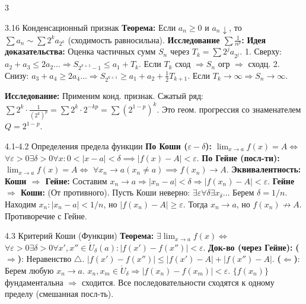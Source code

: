\documentclass[8pt, a4paper, landscape]{extarticle}
\newcommand{\Ra}{\Rightarrow}
\newcommand{\eps}{\varepsilon}
\begin{document}
\begin{multicols*}{3}
\begin{ticket}{3.16 Конденсационный признак}
\textbf{Теорема:} Если $a_n \ge 0$ и $a_n \downarrow$, то
$\sum a_n \sim \sum 2^k a_{2^k}$ (сходимость равносильна).
\textbf{Исследование $\sum \frac{1}{n^p}$:}
\tcblower
\textbf{Идея доказательства:}
Оценка частичных сумм $S_n$ через $T_k = \sum 2^j a_{2^j}$.
1. Сверху: $a_2+a_3 \le 2a_2 \dots \Ra S_{2^{k+1}-1} \le a_1 + T_k$.
Если $T_k$ сход $\Ra S_n$ огр $\Ra$ сходц.
2. Снизу: $a_3+a_4 \ge 2a_4 \dots \Ra S_{2^{k+1}} \ge a_1 + a_2 + \frac{1}{2}T_{k+1}$.
Если $T_k \to \infty \Ra S_n \to \infty$.

\textbf{Исследование:}
Применим конд. признак. Сжатый ряд:
$\sum 2^k \cdot \frac{1}{(2^k)^p} = \sum 2^k \cdot 2^{-kp} = \sum (2^{1-p})^k$.
Это геом. прогрессия со знаменателем $Q = 2^{1-p}$.
\end{ticket}



\begin{ticket}{4.1-4.2 Определения предела функции}
\textbf{По Коши ($\varepsilon-\delta$):} $\lim_{x\to a} f(x)=A \iff$
$\forall \eps>0 \exists \delta>0 \forall x: 0 < |x-a| < \delta \implies |f(x)-A| < \eps$.
\textbf{По Гейне (посл-ти):} $\lim_{x\to a} f(x)=A \iff$
$\forall x_n \to a (x_n \ne a) \implies f(x_n) \to A$.
\tcblower
\textbf{Эквивалентность:}
\textbf{Коши $\Ra$ Гейне:} Составим $x_n \to a \Ra |x_n-a| < \delta \Ra |f(x_n)-A| < \eps$.
\textbf{Гейне $\Ra$ Коши:} (От противного).
Пусть Коши неверно: $\exists \eps \forall \delta \exists x_\delta \dots$
Берем $\delta = 1/n$. Находим $x_n: |x_n-a| < 1/n$, но $|f(x_n)-A| \ge \eps$.
Тогда $x_n \to a$, но $f(x_n) \not\to A$. Противоречие с Гейне.
\end{ticket}

\begin{ticket}{4.3 Критерий Коши (Функции)}
\textbf{Теорема:} $\exists \lim_{x\to a} f(x) \iff$
$\forall \eps>0 \exists \delta>0 \forall x', x'' \in \mathring{U}_\delta(a): |f(x') - f(x'')| < \eps$.
\tcblower
\textbf{Док-во (через Гейне):}
\textbf{($\Ra$)}: Неравенство $\triangle$. $|f(x')-f(x'')| \le |f(x')-A| + |f(x'')-A|$.
\textbf{($\Leftarrow$)}: Берем любую $x_n \to a$.
$x_n, x_m \in \mathring{U}_\delta \Ra |f(x_n)-f(x_m)| < \eps$.
$\{f(x_n)\}$ фундаментальна $\Ra$ сходится.
Все последовательности сходятся к одному пределу (смешанная посл-ть).
\end{ticket}


\end{multicols*}
\end{document}
